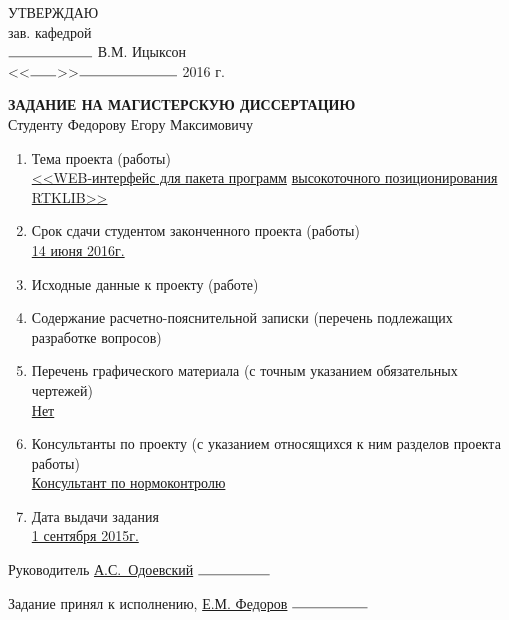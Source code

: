 

\newcommand{\offset}{5.6cm}
\newcommand{\ruleD}{0.15mm}



\hfill\begin{minipage}{\dimexpr\textwidth-\offset}
УТВЕРЖДАЮ \\
зав. кафедрой \\
$\rule{2.1cm}{\ruleD}$ В.М. Ицыксон \\
<<$\rule{0.65cm}{\ruleD}$>>$\rule{2.45cm}{\ruleD}$ 2016 г.\\[1.0cm]
\end{minipage}




\begin{center}
\textbf{ЗАДАНИЕ НА МАГИСТЕРСКУЮ ДИССЕРТАЦИЮ}\\
Студенту Федорову Егору Максимовичу\\
\end{center}


\begin{enumerate}
	\item Тема проекта (работы)\\
		\underline{<<WEB-интерфейс для пакета программ}
		\underline{высокоточного позиционирования RTKLIB>>}
	\item Срок сдачи студентом законченного проекта (работы)\\
		\underline{14 июня 2016г.}
	\item Исходные данные к проекту (работе)\\
	\item Содержание расчетно-пояснительной записки (перечень подлежащих разработке вопросов)\\
	\item Перечень графического материала (с точным указанием обязательных чертежей)\\
		\underline{Нет}
	\item Консультанты по проекту (с указанием относящихся к ним разделов проекта работы)\\
		\underline{Консультант по нормоконтролю}
	\item Дата выдачи задания\\
		\underline{1 сентября 2015г.}
\end{enumerate}




Руководитель \underline{А.С.~Одоевский} \hspace{1.9cm} $\rule{1.8cm}{\ruleD}$

Задание принял к исполнению, \underline{Е.М. Федоров} \hspace{0.47cm}$\rule{1.9cm}{\ruleD}$


\thispagestyle{empty}
